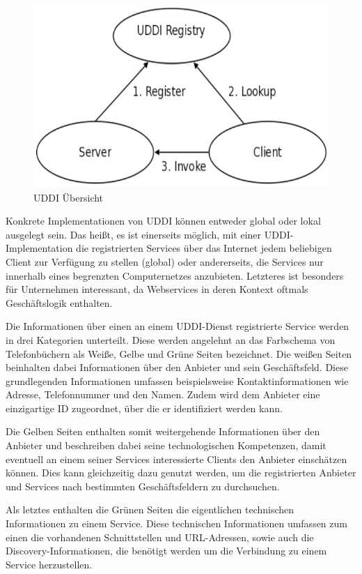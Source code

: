 \documentclass[conference,compsoc]{IEEEtran}
\begin{document}
\begin{figure}
\label{UDDIBild}
\includegraphics[scale=0.45]{UDDI.png}
UDDI Übersicht
\end{figure}

Konkrete Implementationen von UDDI können entweder global oder lokal ausgelegt sein. Das heißt, es ist einerseits möglich, mit einer UDDI-Implementation die registrierten Services über das Internet jedem beliebigen Client zur Verfügung zu stellen (global) oder andererseits, die Services nur innerhalb eines begrenzten Computernetzes anzubieten. Letzteres ist besonders für Unternehmen interessant, da Webservices in deren Kontext oftmals Geschäftslogik enthalten.

Die Informationen über einen an einem UDDI-Dienst registrierte Service werden in drei Kategorien unterteilt. Diese werden angelehnt an das Farbschema von Telefonbüchern als Weiße, Gelbe und Grüne Seiten bezeichnet. Die weißen Seiten beinhalten dabei Informationen über den Anbieter und sein Geschäftsfeld. Diese grundlegenden Informationen umfassen beispielsweise Kontaktinformationen wie Adresse, Telefonnummer und den Namen. Zudem wird dem Anbieter eine einzigartige ID zugeordnet, über die er identifiziert werden kann.

Die Gelben Seiten enthalten somit weitergehende Informationen über den Anbieter und beschreiben dabei seine technologischen Kompetenzen, damit eventuell an einem seiner Services interessierte Clients den Anbieter einschätzen können. Dies kann gleichzeitig dazu genutzt werden, um die registrierten Anbieter und Services nach bestimmten Geschäftsfeldern zu durchsuchen.

Als letztes enthalten die Grünen Seiten die eigentlichen technischen Informationen zu einem Service. Diese technischen Informationen umfassen zum einen die vorhandenen Schnittstellen und URL-Adressen, sowie auch die Discovery-Informationen, die benötigt werden um die Verbindung zu einem Service herzustellen.
\end{document}
